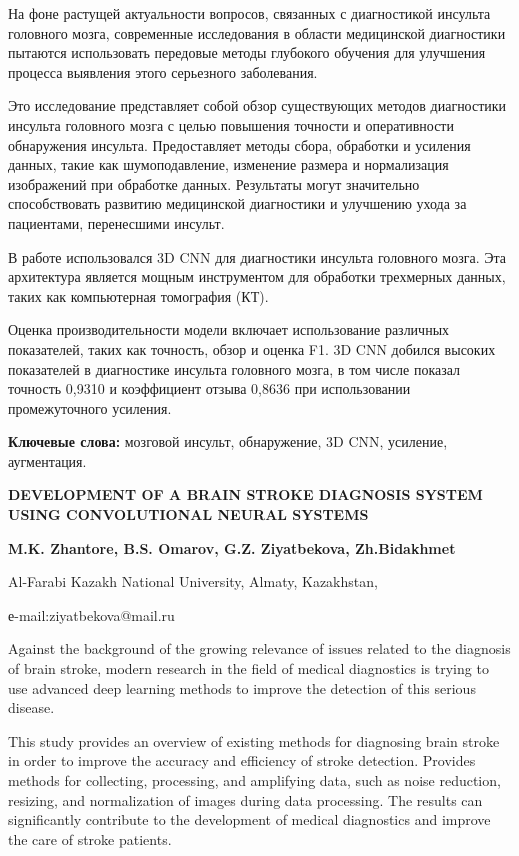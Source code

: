 На фоне растущей актуальности вопросов, связанных с диагностикой
инсульта головного мозга, современные исследования в области медицинской
диагностики пытаются использовать передовые методы глубокого обучения
для улучшения процесса выявления этого серьезного заболевания.

Это исследование представляет собой обзор существующих методов
диагностики инсульта головного мозга с целью повышения точности и
оперативности обнаружения инсульта. Предоставляет методы сбора,
обработки и усиления данных, такие как шумоподавление, изменение размера
и нормализация изображений при обработке данных. Результаты могут
значительно способствовать развитию медицинской диагностики и улучшению
ухода за пациентами, перенесшими инсульт.

В работе использовался 3D CNN для диагностики инсульта головного мозга.
Эта архитектура является мощным инструментом для обработки трехмерных
данных, таких как компьютерная томография (КТ).

Оценка производительности модели включает использование различных
показателей, таких как точность, обзор и оценка F1. 3D CNN добился
высоких показателей в диагностике инсульта головного мозга, в том числе
показал точность 0,9310 и коэффициент отзыва 0,8636 при использовании
промежуточного усиления.

{\bfseries Ключевые слова:} мозговой инсульт, обнаружение, 3D CNN,
усиление, аугментация.
\newpage
\begin{center}
{\large\bfseries DEVELOPMENT OF A BRAIN STROKE DIAGNOSIS SYSTEM USING
CONVOLUTIONAL NEURAL SYSTEMS}

{\bfseries M.K. Zhantore, B.S. Omarov, G.Z. Ziyatbekova\envelope, Zh.Bidakhmet}

Al-Farabi Kazakh National University, Almaty, Kazakhstan,

е-mail:ziyatbekova@mail.ru
\end{center}

Against the background of the growing relevance of issues related to the
diagnosis of brain stroke, modern research in the field of medical
diagnostics is trying to use advanced deep learning methods to improve
the detection of this serious disease.

This study provides an overview of existing methods for diagnosing brain
stroke in order to improve the accuracy and efficiency of stroke
detection. Provides methods for collecting, processing, and amplifying
data, such as noise reduction, resizing, and normalization of images
during data processing. The results can significantly contribute to the
development of medical diagnostics and improve the care of stroke
patients.

